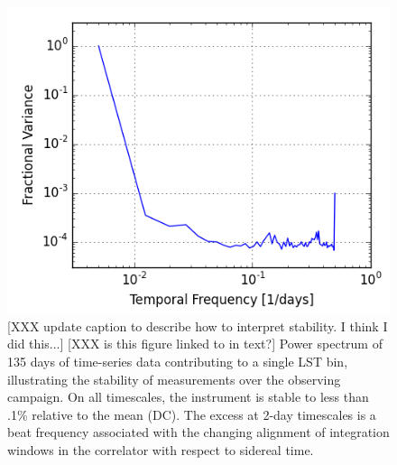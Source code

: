 \documentclass[twocolumn,numberedappendix]{emulateapj} \shorttitle{PSA64}
\begin{document}
\begin{figure}
\centering
\includegraphics[width=\columnwidth]{plots/stability.png}
\caption{
[XXX update caption to describe how to interpret stability. I think I did this...]
[XXX is this figure linked to in text?]
Power spectrum of 135 days of time-series data contributing to a single LST
bin, illustrating the stability of measurements over the observing campaign.
On all timescales, the instrument is stable to less than .1\% relative to the
mean (DC). The excess at 2-day timescales is a beat frequency associated with
the changing alignment of integration windows in the correlator with respect to
sidereal time.  
}\label{fig:stability}
\end{figure}
\end{document}
